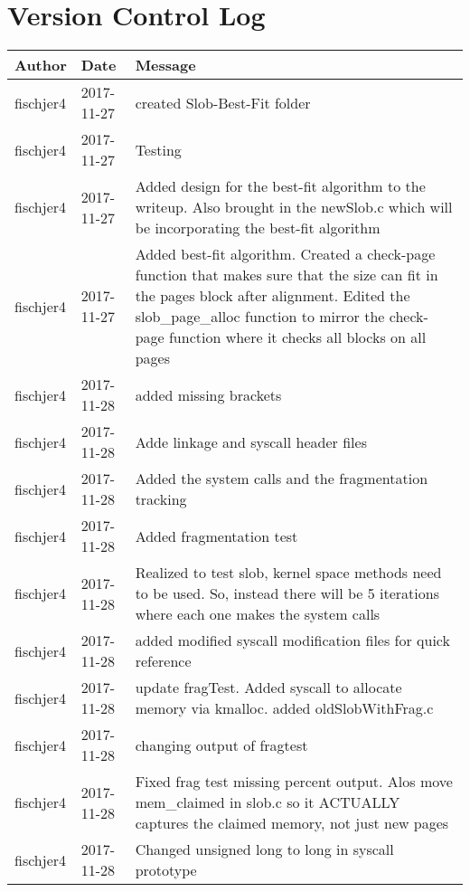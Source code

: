 \documentclass[draftclsnofoot, onecolumn, 10pt, compsoc]{IEEEtran}
\begin{document}
	\section{Version Control Log}
		\begin{center}
			\begin{longtabu} to \textwidth {|
					X[4,l]|
					X[3,c]|
					X[8,l]|}
				\hline
				\textbf{Author} & \textbf{Date} & \textbf{Message} \\ \hline
	
				fischjer4 & 2017-11-27 & created Slob-Best-Fit folder \\ \hline
				fischjer4 & 2017-11-27 & Testing \\ \hline
				fischjer4 & 2017-11-27 & Added design for the best-fit algorithm to the writeup. Also brought in the newSlob.c which will be incorporating the best-fit algorithm \\ \hline
				fischjer4 & 2017-11-27 & Added best-fit algorithm. Created a check-page function that makes sure that the size can fit in the pages block after alignment. Edited the slob\_page\_alloc function to mirror the check-page function where it checks all blocks on all pages \\ \hline
				fischjer4 & 2017-11-28 & added missing brackets \\ \hline
				fischjer4 & 2017-11-28 & Adde linkage and syscall header files \\ \hline
				fischjer4 & 2017-11-28 & Added the system calls and the fragmentation tracking \\ \hline
				fischjer4 & 2017-11-28 & Added fragmentation test \\ \hline
				fischjer4 & 2017-11-28 & Realized to test slob, kernel space methods need to be used. So, instead there will be 5 iterations where each one makes the system calls \\ \hline
				fischjer4 & 2017-11-28 & added modified syscall modification files for quick reference \\ \hline
				fischjer4 & 2017-11-28 & update fragTest. Added syscall to allocate memory via kmalloc. added oldSlobWithFrag.c \\ \hline
				fischjer4 & 2017-11-28 & changing output of fragtest \\ \hline
				fischjer4 & 2017-11-28 & Fixed frag test missing percent output. Alos move mem\_claimed in slob.c so it ACTUALLY captures the claimed memory, not just new pages \\ \hline
				fischjer4 & 2017-11-28 & Changed unsigned long to long in syscall prototype \\ \hline

\end{longtabu}
\end{center}
\end{document}
